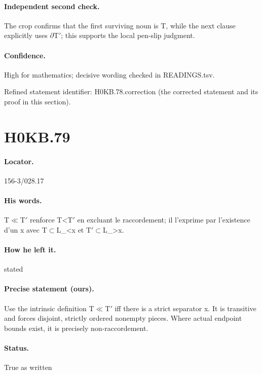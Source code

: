 \paragraph{Independent second check.} The crop confirms that the first surviving noun is T, while the next clause explicitly uses \ensuremath{\partial}T\ensuremath{\prime}; this supports the local pen-slip judgment.

\paragraph{Confidence.} High for mathematics; decisive wording checked in READINGS.tsv.

\noindent Refined statement identifier: H0KB.78.correction (the corrected statement and its proof in this section).

\section*{H0KB.79}\label{statement:H0KB.79}
\paragraph{Locator.} 156-3/028.17

\paragraph{His words.} T\ensuremath{\ll}T\ensuremath{\prime} renforce T<T\ensuremath{\prime} en excluant le raccordement; il l’exprime par l’existence d’un x avec T\ensuremath{\subset}L\_<x et T\ensuremath{\prime}\ensuremath{\subset}L\_>x.

\paragraph{How he left it.} stated

\paragraph{Precise statement (ours).} Use the intrinsic definition T\ensuremath{\ll}T\ensuremath{\prime} iff there is a strict separator x. It is transitive and forces disjoint, strictly ordered nonempty pieces. Where actual endpoint bounds exist, it is precisely non-raccordement.

\paragraph{Status.} True as written


